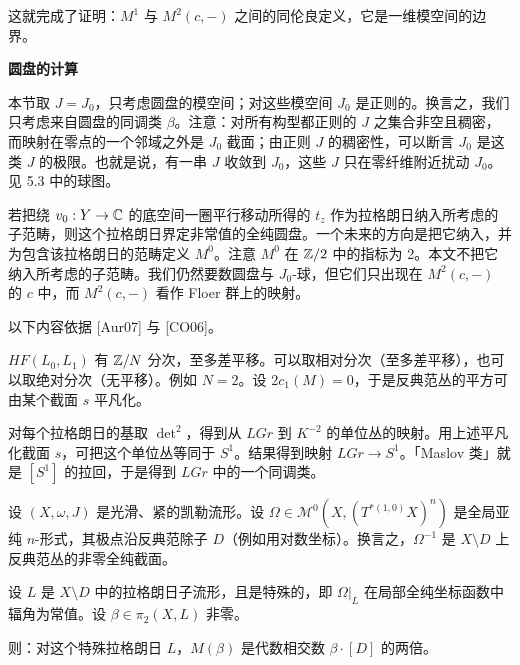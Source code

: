 这就完成了证明：$M^1$ 与 $M^2(c,-)$ 之间的同伦良定义，它是一维模空间的边界。

\medskip\noindent\textbf{圆盘的计算}\par
本节取 $J=J_0$，只考虑圆盘的模空间；对这些模空间 $J_0$ 是正则的。换言之，我们只考虑来自圆盘的同调类 $\beta$。注意：对所有构型都正则的 $J$ 之集合非空且稠密，而映射在零点的一个邻域之外是 $J_0$ 截面；由正则 $J$ 的稠密性，可以断言 $J_0$ 是这类 $J$ 的极限。也就是说，有一串 $J$ 收敛到 $J_0$，这些 $J$ 只在零纤维附近扰动 $J_0$。见 5.3 中的球图。


\begin{remark}\label{rem:M0}
若把绕 $v_0:Y\to\mathbb{C}$ 的底空间一圈平行移动所得的 $t_z$ 作为拉格朗日纳入所考虑的子范畴，则这个拉格朗日界定非常值的全纯圆盘。一个未来的方向是把它纳入，并为包含该拉格朗日的范畴定义 $M^0$。注意 $M^0$ 在 $\mathbb{Z}/2$ 中的指标为 2。本文不把它纳入所考虑的子范畴。我们仍然要数圆盘与 $J_0$-球，但它们只出现在 $M^2(c,-)$ 的 $c$ 中，而 $M^2(c,-)$ 看作 Floer 群上的映射。
\end{remark}

以下内容依据 [Aur07] 与 [CO06]。

\begin{definition}\label{def:maslov}
$HF(L_0,L_1)$ 有 $\mathbb{Z}/N$ 分次，至多差平移。可以取相对分次（至多差平移），也可以取绝对分次（无平移）。例如 $N=2$。设 $2c_1(M)=0$，于是反典范丛的平方可由某个截面 $s$ 平凡化。
\end{definition}

对每个拉格朗日的基取 $\det^2$，得到从 $LGr$ 到 $K^{-2}$ 的单位丛的映射。用上述平凡化截面 $s$，可把这个单位丛等同于 $S^1$。结果得到映射 $LGr\to S^1$。「Maslov 类」就是 $[S^1]$ 的拉回，于是得到 $LGr$ 中的一个同调类。

\begin{lemma}[{[Aur07, §3.1]}]\label{lem:maslov}
设 $(X,\omega,J)$ 是光滑、紧的凯勒流形。设 $\Omega\in\mathcal{M}^0(X,(T^{*(1,0)}X)^n)$ 是全局亚纯 $n$-形式，其极点沿反典范除子 $D$（例如用对数坐标）。换言之，$\Omega^{-1}$ 是 $X\setminus D$ 上反典范丛的非零全纯截面。

设 $L$ 是 $X\setminus D$ 中的拉格朗日子流形，且是特殊的，即 $\Omega|_L$ 在局部全纯坐标函数中辐角为常值。设 $\beta\in\pi_2(X,L)$ 非零。

则：对这个特殊拉格朗日 $L$，$M(\beta)$ 是代数相交数 $\beta\cdot[D]$ 的两倍。
\end{lemma}

